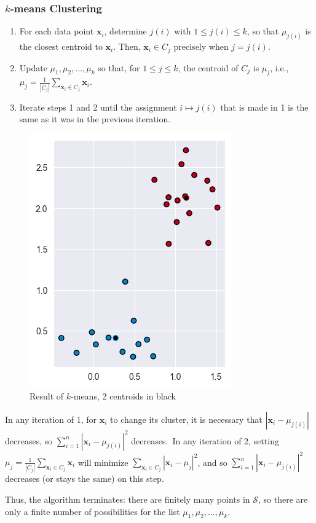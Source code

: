 \documentclass[smaller]{beamer}
\theoremstyle{example}
\newcommand{\x}{\textbf{x}}
\begin{document}
\begin{frame}
    \frametitle{$k$-means Clustering}
    \begin{enumerate}
        \item For each data point $\x_i$, determine $j(i)$ with $1\le j(i)\le k$, so that $\mu_{j(i)}$ is the closest centroid to $\x_i$. Then, $\x_i \in C_j$ precisely when $j=j(i)$.
        \item Update $\mu_1,\mu_2,\ldots,\mu_k$ so that, for $1\le j\le k$, the centroid of $C_j$ is $\mu_j$, i.e., $\mu_j = \frac{1}{|C_j|}\sum_{\x_i\in C_j}\x_i$.
        \item Iterate steps {\color{mygreen}1} and {\color{mygreen}2} until the assignment $i\mapsto j(i)$ that is made in {\color{mygreen}1} is the same as it was in the previous iteration.
    \end{enumerate}
    \vfill

    \begin{minipage}{\textwidth}
    \begin{figure}
            \includegraphics[height=0.3\textheight]{../../Images/kmeans_4.png}
        \caption{Result of $k$-means, 2 centroids in black}
    \end{figure}

    In any iteration of {\color{mygreen}1}, for $\x_i$ to change its cluster, it is necessary that $|\x_i - \mu_{j(i)}|$ decreases, so \mbox{$\sum_{i=1}^n|\x_i - \mu_{j(i)}|^2$} decreases.\pause \ In any iteration of {\color{mygreen}2}, setting $\mu_j = \frac{1}{|C_j|}\sum_{\x_i\in C_j}\x_i$ will minimize $\sum_{\x_i\in C_j}|\x_i-\mu_j|^2$, and so $\sum_{i=1}^n|\x_i - \mu_{j(i)}|^2$ decreases (or stays the same) on this step.

    \pause
    Thus, the algorithm terminates: there are finitely many points in $\mathcal S$, so there are only a finite number of possibilities for the list $\mu_1, \mu_2, \ldots, \mu_k$.
    \end{minipage}
\end{frame}
\end{document}
